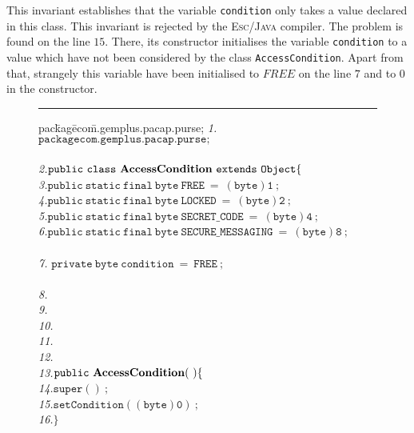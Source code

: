 This invariant establishes that the variable \texttt{condition} only
takes a value declared in this class. This invariant is rejected by
the \textsc{Esc/Java} compiler. The problem is found on the line
$15$. There, its constructor initialises the variable
\texttt{condition} to a value which have not been considered by the
class \texttt{AccessCondition}. Apart from that, strangely this
variable have been initialised to $FREE$ on the line $7$ and to $0$
in the constructor.




\begin{center}
\begin{figure}[hbt]
\rule{\linewidth}{0.3mm}
\rule{0em}{0.1ex}
\begin{tabbing} 
pac\=kag\=eco\=m.gemplus.pacap.purse; \kill 
\emph{1.}\>$\mathtt{package com.gemplus.pacap.purse;}$\\
\\
\emph{2.}\>$\mathtt{public\ class\ {\bf AccessCondition}\ extends\ Object\{}$\\

\emph{3.}\>\>$\mathtt{public\ static\ final\ byte\ FREE\		=\ (byte)1\ ;}$\\
\emph{4.}\>\>$\mathtt{public\ static\ final\ byte\ LOCKED\		=\ (byte)2\ ;}$\\
\emph{5.}\>\>$\mathtt{public\ static\ final\ byte\ SECRET\_CODE\	=\ (byte)4\ ;}$\\
\emph{6.}\>\>$\mathtt{public\ static\ final\ byte\ SECURE\_MESSAGING\	=\
(byte)8\ ; }$\\
\\
\emph{7.}\> $\mathtt{private\ byte\ condition\ =\ FREE\ ;}$\\
\\
\emph{8.}\>\\
\emph{9.}\>\>\\
\emph{10.}\>\>\\
\emph{11.}\>\>\\
\emph{12.}\>\>{\it */} \\
\emph{13.}\>\>$\mathtt{public\ {\bf AccessCondition}(\ ) \{}$\\
\emph{14.}\>\>\>$\mathtt{super()\ ;}$\\
\emph{15.}\>\>\>$\mathtt{setCondition((byte)0)\ ;}$\\
\emph{16.}\>\>$\mathtt{\}}$\\


\end{tabbing}
\end{figure}
\end{center}
